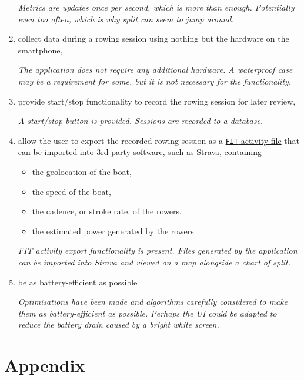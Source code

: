 \documentclass[11pt,twoside,a4paper]{report}
\newcommand\invisiblesection[1]{%
  \refstepcounter{section}%
  \addcontentsline{toc}{section}{\protect\numberline{\thesection}#1}%
  \sectionmark{#1}}
\begin{document}
\begin{enumerate}
  \textit{Metrics are updates once per second, which is more than enough. Potentially even too often, which is why split can seem to jump around.}
  \item collect data during a rowing session using nothing but the hardware on the smartphone,
  
  \textit{The application does not require any additional hardware. A waterproof case may be a requirement for some, but it is not necessary for the functionality.}
  \item provide start/stop functionality to record the rowing session for later review,
  
  \textit{A start/stop button is provided. Sessions are recorded to a database.}
  \item allow the user to export the recorded rowing session as a \href{https://developer.garmin.com/fit/file-types/activity/}{\texttt{FIT} activity file} that can be imported into 3rd-party software, such as \href{https://strava.com}{Strava}, containing
  \begin{itemize}
    \item the geolocation of the boat,
    \item the speed of the boat,
    \item the cadence, or stroke rate, of the rowers,
    \item the estimated power generated by the rowers
  \end{itemize}

  \textit{FIT activity export functionality is present. Files generated by the application can be imported into Strava and viewed on a map alongside a chart of split.}
  \item be as battery-efficient as possible
  
  \textit{Optimisations have been made and algorithms carefully considered to make them as battery-efficient as possible. Perhaps the UI could be adapted to reduce the battery drain caused by a bright white screen.}
\end{enumerate}

\chapter{Appendix}




\end{document}
